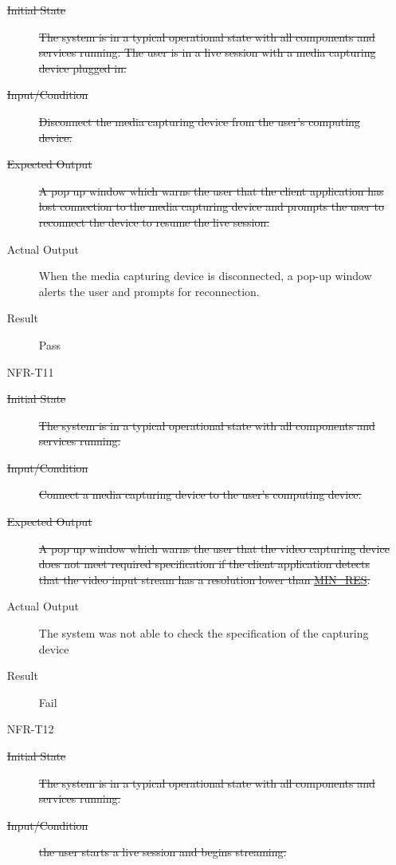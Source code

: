 \documentclass[12pt, titlepage]{article}
\begin{document}
\begin{enumerate}
\begin{description}
      \item[\sout{Initial State}] \sout{The system is in a typical operational
          state with all components and services running. The user is in a live
          session with a media capturing device plugged in.}
      \item[\sout{Input/Condition}] \sout{Disconnect the media capturing device
          from the user’s computing device.}
      \item[\sout{Expected Output}] \sout{A pop up window which warns the user that
          the client application has lost connection to the media capturing
          device and prompts the user to reconnect the device to resume the live
          session.}
      \item[Actual Output] When the media capturing device is disconnected, a pop-up
        window alerts the user and prompts for reconnection.
      \item[Result] Pass
      \end{description}
    \item[NFR-T11] \label{NFRT11}
      \begin{description}
      \item[\sout{Initial State}] \sout{The system is in a typical operational
          state with all components and services running.}
      \item[\sout{Input/Condition}] \sout{Connect a media capturing device to the
          user’s computing device.}
      \item[\sout{Expected Output}] \sout{A pop up window which warns the user that
          the video capturing device does not meet required specification if the
          client application detects that the video input stream has a
          resolution lower than \hyperref[const:res]{MIN\_RES}.}
      \item[Actual Output] The system was not able to check the specification of the
        capturing device
      \item[Result] Fail
      \end{description}
    \item[NFR-T12] \label{NFRT12}
      \begin{description}
      \item[\sout{Initial State}] \sout{The system is in a typical operational
          state with all components and services running.}
      \item[\sout{Input/Condition}] \sout{the user starts a live session and begins
          streaming.}

\end{description}
\end{enumerate}
\end{document}
